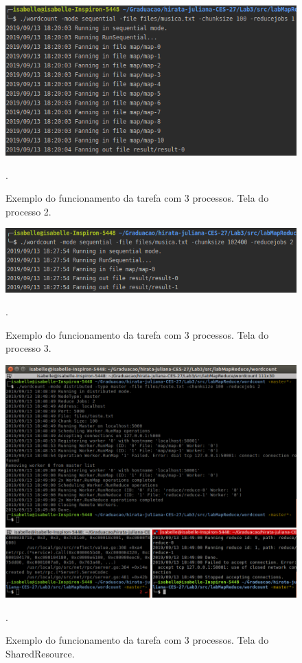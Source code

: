 \documentclass[conference]{IEEEtran}
\begin{document}
\begin{figure}[H]
\centering
\centerline{\includegraphics[scale=0.5]{imagens/tarefa_1_4_2/tarefa_1_4_2.png}}
\caption{Exemplo do funcionamento da tarefa com 3 processos. Tela do processo 2.}.
\label{ex1-proc2-clean}
\end{figure}

\begin{figure}[H]
\centering
\centerline{\includegraphics[scale=0.5]{imagens/tarefa_1_4_3/tarefa_1_4_3.png}}
\caption{Exemplo do funcionamento da tarefa com 3 processos. Tela do processo 3.}.
\label{ex1-proc3-clean}
\end{figure}

\begin{figure}[H]
\centering
\centerline{\includegraphics[scale=0.5]{imagens/tarefa_2_3_map/tarefa_2_3_map.png}}
\caption{Exemplo do funcionamento da tarefa com 3 processos. Tela do SharedResource.}.
\label{ex1-shared-clean}
\end{figure}
	
\end{document}
